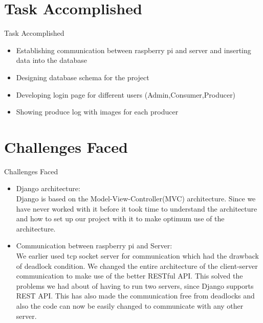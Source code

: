 \documentclass[10pt, a4paper]{beamer}
\begin{document}
\section{Task Accomplished}
\begin{frame}{Task Accomplished}
    \begin{itemize}
        \item Establishing communication between raspberry pi and server and inserting data into the database
        \item Designing database schema for the project
        \item Developing login page for different users (Admin,Consumer,Producer)
        \item Showing produce log with images for each producer
    \end{itemize}
\end{frame}

\section{Challenges Faced}
\begin{frame}{Challenges Faced}
    \begin{itemize}
        \item Django architecture: \\Django is based on the Model-View-Controller(MVC) architecture. Since we have never worked with it before it took time to understand the architecture and how to set up our project with it to make optimum use of the architecture. 
        \item Communication between raspberry pi and Server:\\We earlier used tcp socket server for communication which had the drawback of deadlock condition. We changed the entire architecture of the client-server communication to make use of the better RESTful API. This solved the problems we had about of having to run two servers, since Django supports REST API. This has also made the communication free from deadlocks and also the code can now be easily changed to communicate with any other server.
    \end{itemize}
\end{frame}
\end{document}
